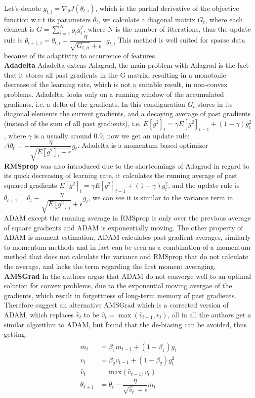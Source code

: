 \documentclass[10pt,a4paper]{article}
\begin{document}
Let's denote $g_{t, i} = \nabla_\theta J( \theta_{t, i} )$, which is the partial derivative of the objective function w.r.t its parameters $\theta_i$, we calculate a diagonal matrix $G_t$, where each element is $G=\sum_{i=1}^{N} g_i g_i^T$, where N is the number of itterations, thus the update rule is $\theta_{t+1, i} = \theta_{t, i} - \dfrac{\eta}{\sqrt{G_{t, ii}} + \epsilon} \cdot g_{t, i}$
This method is well suited for sparse data because of its adaptivity to occurrence of features.
\\
\textbf{Adadelta} 
Adadelta extens Adagrad, the main problem with Adagrad is the fact that it stores all past gradients in the G matrix, resulting in a monotonic decrease of the learning rate, which is not a suitable result, in non-convex problems. Adadelta, looks only on a running window of the accumulated gradients, i.e. a delta of the gradients.
In this condiguration $G_t$ stores in its diagonal elements the current gradients, and a decaying average of past gradients (instead of the sum of all past gradients), i.e. $ E[g^2]_t = \gamma E[g^2]_{t-1} + (1 - \gamma) g^2_t$, where $\gamma$ is a usually around 0.9, now we get an update rule: $\Delta \theta_t = - \dfrac{\eta}{\sqrt{E[g^2]_t + \epsilon}} g_{t}$. Adadelta is a momentum based optimizer
\\
\textbf{RMSprop} was also introduced due to the shortcomings of Adagrad in regard to its quick decreasing of learning rate, it calculates the running average of past squared gradients $E[g^2]_t = \gamma E[g^2]_{t-1} + (1 - \gamma) g^2_t$, and the update rule is $\theta_{t+1} = \theta_{t} - \dfrac{\eta}{\sqrt{E[g^2]_t} + \epsilon} g_{t}$, we can see it is similar to the variance term in ADAM except the running average in RMSprop is only over the previous average of square gradients and ADAM is exponentially moving.
The other property of ADAM is moment estimation, ADAM calculates past gradient averages, similarly to momentum methods and in fact can be seen as a combination of a momentum method that does not calculate the variance and RMSprop that do not calculate the average, and lacks the term regarding the first moment averaging.\\
\textbf{AMSGrad} In \cite{reddi2019convergence} the authors argue that ADAM do not converge well to an optimal solution for convex problems, due to the exponential moving avergae of the gradients, which result in forgettness of long-term memory of past gradients. Therefore suggest an alternative AMSGrad which is a corrected version of ADAM, which replaces $\hat{v}_t$ to be $\hat{v}_t = \max(\hat{v}_{t-1}, v_t)$, all in all the authors get a similar algorithm to ADAM, but found that the de-biasing can be avoided, thus getting:
\begin{align} 
    \begin{split} 
    m_t &= \beta_1 m_{t-1} + (1 - \beta_1) g_t \\ 
    v_t &= \beta_2 v_{t-1} + (1 - \beta_2) g_t^2\\ 
    \hat{v}_t &= \text{max}(\hat{v}_{t-1}, v_t) \\ 
    \theta_{t+1} &= \theta_{t} - \dfrac{\eta}{\sqrt{\hat{v}_t} + \epsilon} m_t 
    \end{split} 
\end{align}
    
\end{document}
